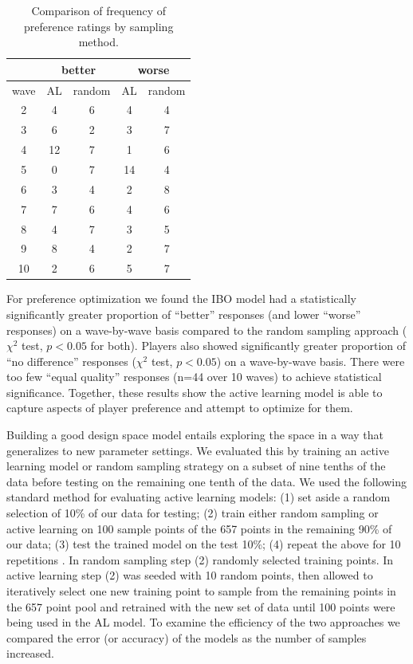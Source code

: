 \documentclass[letterpaper]{article}
\begin{document}
\begin{table}[tb]
\centering
\begin{tabular}{|c|cc|cc|}
\hline  & \multicolumn{2}{|c|}{better} & \multicolumn{2}{|c|}{worse}  \\ 
\hline wave & AL & random & AL & random \\ 
\hline 2 & 4 & 6 & 4 & 4 \\ 
\hline 3 & 6 & 2 & 3 & 7 \\ 
\hline 4 & 12 & 7 & 1 & 6 \\ 
\hline 5 & 0 & 7 & 14 & 4 \\ 
\hline 6 & 3 & 4 & 2 & 8 \\ 
\hline 7 & 7 & 6 & 4 & 6 \\ 
\hline 8 & 4 & 7 & 3 & 5 \\ 
\hline 9 & 8 & 4 & 2 & 7 \\ 
\hline 10 & 2 & 6 & 5 & 7 \\ 
\hline 
\end{tabular}
\caption{Comparison of frequency of preference ratings by sampling method.}
\label{tab:pref_proportion}
\end{table}

For preference optimization we found the IBO model had a statistically significantly greater proportion of ``better'' responses (and lower ``worse'' responses) on a wave-by-wave basis compared to the random sampling approach ($\chi^2$ test, $p<0.05$ for both). Players also showed significantly greater proportion of ``no difference'' responses ($\chi^2$ test, $p<0.05$) on a wave-by-wave basis. There were too few ``equal quality'' responses (n=44 over 10 waves) to achieve statistical significance. Together, these results show the active learning model is able to capture aspects of player preference and attempt to optimize for them.

Building a good design space model entails exploring the space in a way that generalizes to new parameter settings. We evaluated this by training an active learning model or random sampling strategy on a subset of nine tenths of the data before testing on the remaining one tenth of the data. We used the following standard method for evaluating active learning models: (1) set aside a random selection of 10\% of our data for testing; (2) train either random sampling or active learning on 100 sample points of the 657 points in the remaining 90\% of our data; (3) test the trained model on the test 10\%; (4) repeat the above for 10 repetitions \cite{settles2012:al-book}. In random sampling step (2) randomly selected training points. In active learning step (2) was seeded with 10 random points, then allowed to iteratively select one new training point to sample from the remaining points in the 657 point pool and retrained with the new set of data until 100 points were being used in the AL model. To examine the efficiency of the two approaches we compared the error (or accuracy) of the models as the number of samples increased.
\end{document}

